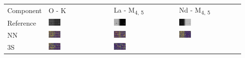 \begin{tabular}{m{}*{3}{M{0.21\textwidth}}}
Component&O - K&La - M\textsubscript{4, 5}&Nd - M\textsubscript{4, 5}\\
Reference
&\includegraphics[width=0.2\textwidth]{img/chapitre4/figure15/synth_hole/SynthH_GT_band_0.png}
&\includegraphics[width=0.2\textwidth]{img/chapitre4/figure15/synth_hole/SynthH_GT_band_1.png}
&\includegraphics[width=0.2\textwidth]{img/chapitre4/figure15/synth_hole/SynthH_GT_band_2.png}
\\
NN
&\includegraphics[width=0.2\textwidth]{img/chapitre4/figure15/synth_hole/SynthH_interpolation_band_0.png}
&\includegraphics[width=0.2\textwidth]{img/chapitre4/figure15/synth_hole/SynthH_interpolation_band_1.png}
&\includegraphics[width=0.2\textwidth]{img/chapitre4/figure15/synth_hole/SynthH_interpolation_band_2.png}
\\
3S
&\includegraphics[width=0.2\textwidth]{img/chapitre4/figure15/synth_hole/SynthH_3S_band_0.png}
&\includegraphics[width=0.2\textwidth]{img/chapitre4/figure15/synth_hole/SynthH_3S_band_1.png}

\end{tabular}
